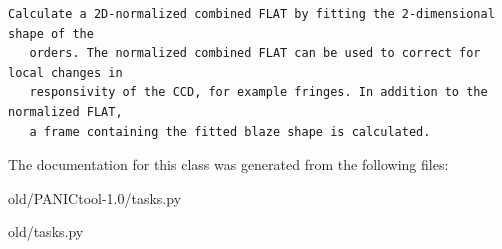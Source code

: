 \footnotesize\begin{verbatim}Calculate a 2D-normalized combined FLAT by fitting the 2-dimensional shape of the
   orders. The normalized combined FLAT can be used to correct for local changes in 
   responsivity of the CCD, for example fringes. In addition to the normalized FLAT,
   a frame containing the fitted blaze shape is calculated. 
\end{verbatim}
\normalsize
 



The documentation for this class was generated from the following files:\begin{CompactItemize}
\item 
old/PANICtool-1.0/tasks.py\item 
old/tasks.py\end{CompactItemize}
